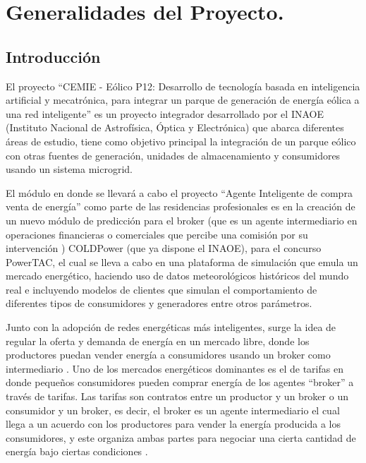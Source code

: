 \chapter{Generalidades del Proyecto.}
\newpage
\begin{center}
    \section*{Introducción}
	El proyecto ``CEMIE - Eólico P12: Desarrollo de tecnología basada en inteligencia artificial y mecatrónica, para integrar un parque de generación de energía eólica a una red inteligente'' es un proyecto integrador desarrollado por el INAOE (Instituto Nacional de Astrofísica, Óptica y Electrónica) que abarca diferentes áreas de estudio, tiene como objetivo principal la integración de un parque eólico con otras fuentes de generación, unidades de almacenamiento y consumidores usando un
sistema microgrid.


El módulo en donde se llevará a cabo el proyecto ``Agente Inteligente de compra venta de energía'' como parte de las residencias profesionales es en la creación de un nuevo módulo de predicción para el broker (que es un agente intermediario en operaciones financieras o comerciales que percibe una comisión por su intervención \cite{RAEDiccionario2014}) 
COLDPower (que ya dispone el INAOE), para el concurso PowerTAC, el cual se lleva a cabo en una plataforma de simulación que emula un mercado energético, haciendo uso de datos meteorológicos históricos del mundo real e incluyendo modelos de clientes que simulan el comportamiento de diferentes tipos de consumidores y generadores entre otros parámetros.


Junto con la adopción de redes energéticas más inteligentes, surge la idea de regular la oferta y demanda de energía en un mercado libre, donde los productores puedan vender energía a consumidores usando un broker como intermediario \cite{Fixed-priceTariffG2015}.
Uno de los mercados energéticos dominantes es el de tarifas en donde pequeños consumidores pueden comprar energía de los agentes ``broker'' a través de tarifas.
Las tarifas son contratos entre un productor y un broker o un consumidor y un broker, es decir, el broker es un agente intermediario el cual llega a un acuerdo con los productores para vender la energía producida a los consumidores, y este organiza ambas partes para negociar una cierta cantidad de energía bajo ciertas condiciones \cite{MPAlonsoAYRGonzalezDesarrolloDeTec}.
\end{center}
